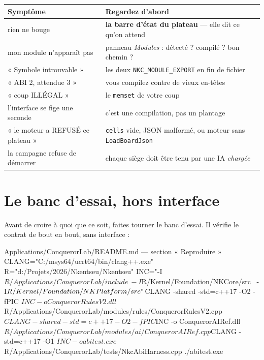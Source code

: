 \begin{center}
\begin{tabular}{@{}p{6.0cm}p{7.8cm}@{}}
\toprule
\textbf{Symptôme} & \textbf{Regardez d'abord} \\
\midrule
rien ne bouge & \textbf{la barre d'état du plateau} — elle dit ce qu'on attend \\
mon module n'apparaît pas & panneau \emph{Modules} : détecté ? compilé ? bon chemin ? \\
« Symbole introuvable » & les deux \texttt{NKC\_MODULE\_EXPORT} en fin de fichier \\
« ABI 2, attendue 3 » & vous compilez contre de vieux en-têtes \\
« coup ILLÉGAL » & le \texttt{memset} de votre coup \\
l'interface se fige une seconde & c'est une compilation, pas un plantage \\
« le moteur a REFUSÉ ce plateau » & \texttt{cells} vide, JSON malformé, ou moteur sans \texttt{LoadBoardJson} \\
la campagne refuse de démarrer & chaque siège doit être tenu par une IA \emph{chargée} \\
\bottomrule
\end{tabular}
\end{center}

\section{Le banc d'essai, hors interface}

Avant de croire à quoi que ce soit, faites tourner le banc d'essai. Il vérifie le
contrat de bout en bout, sans interface :

\begin{nkcode}{Applications/ConquerorLab/README.md — section « Reproduire »}
CLANG="C:/msys64/ucrt64/bin/clang++.exe"
R="d:/Projets/2026/Nkentseu/Nkentseu"
INC="-I$R/Applications/ConquerorLab/include \
     -I$R/Kernel/Foundation/NKCore/src \
     -I$R/Kernel/Foundation/NKPlatform/src"

$CLANG -shared -std=c++17 -O2 -fPIC $INC -o ConquerorRulesV2.dll \
       $R/Applications/ConquerorLab/modules/rules/ConquerorRulesV2.cpp
$CLANG -shared -std=c++17 -O2 -fPIC $INC -o ConquerorAIRef.dll \
       $R/Applications/ConquerorLab/modules/ai/ConquerorAIRef.cpp
$CLANG -std=c++17 -O1 $INC -o abitest.exe \
       $R/Applications/ConquerorLab/tests/NkcAbiHarness.cpp
./abitest.exe
\end{nkcode}

